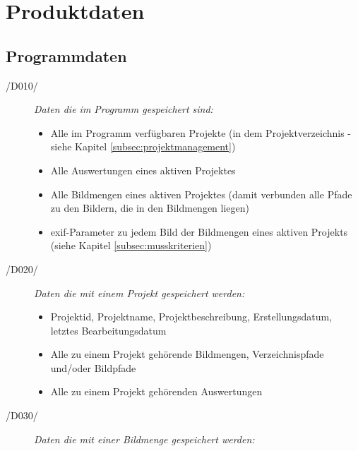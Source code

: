 \section{Produktdaten}

\subsection{Programmdaten}

\label{subsec:programmdaten}

\begin{description}
	
	\item[/D010/] \textit{Daten die im Programm gespeichert sind:}
	
	\begin{itemize} 
			
			\item Alle im Programm verfügbaren Projekte (in dem Projektverzeichnis - siehe Kapitel \ref{subsec:projektmanagement})
			
			\item Alle Auswertungen eines aktiven Projektes
			
			\item Alle Bildmengen eines aktiven Projektes (damit verbunden alle Pfade zu den Bildern, die in den Bildmengen liegen)
			
			\item \gls{exif}-Parameter zu jedem Bild der Bildmengen eines aktiven Projekts (siehe Kapitel \ref{subsec:musskriterien})
	
	\end{itemize}

	\item[/D020/] \textit{Daten die mit einem Projekt gespeichert werden:}
	
	\begin{itemize}
		
		\item Projektid, Projektname, Projektbeschreibung, Erstellungsdatum, letztes Bearbeitungsdatum
		
		\item Alle zu einem Projekt gehörende Bildmengen, Verzeichnispfade und/oder Bildpfade
		
		\item Alle zu einem Projekt gehörenden Auswertungen
	
	\end{itemize}

	\item[/D030/] \textit{Daten die mit einer Bildmenge gespeichert werden:}
	

\end{description}
